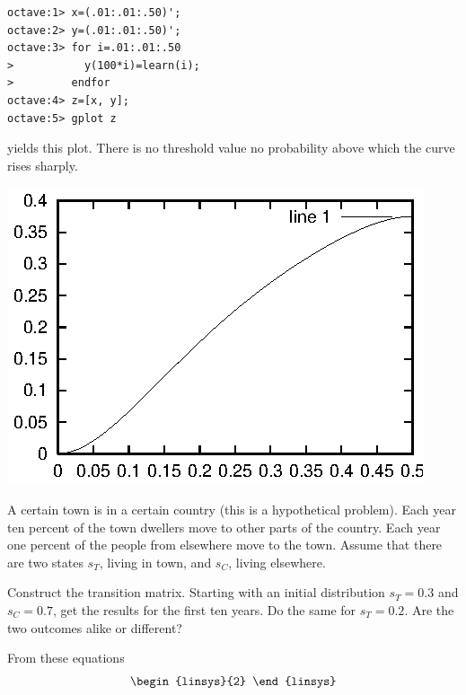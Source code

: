 \begin{exercises}
\begin{answer}
\begin{exparts}
\begin{lstlisting}
octave:1> x=(.01:.01:.50)';
octave:2> y=(.01:.01:.50)';
octave:3> for i=.01:.01:.50   
>           y(100*i)=learn(i);
>         endfor
octave:4> z=[x, y];
octave:5> gplot z
\end{lstlisting}
        yields this plot.
        There is no threshold value \Dash  no probability above which the
        curve rises sharply.
        \begin{center}
          \includegraphics{learn5.eps}
        \end{center}
      \end{exparts}
    \end{answer}
  \item 
     A certain town is in a certain country 
     (this is a hypothetical problem).
     Each year ten percent of the town dwellers move to other parts of 
     the country.
     Each year one percent of the people from elsewhere move to the town.
     Assume that there are two states $s_T$, living in town, and $s_C$,
     living elsewhere.
     \begin{exparts}
       \partsitem Construct the transition matrix.
       \partsitem Starting with an initial distribution $s_T=0.3$
         and $s_C=0.7$, get the results for the first ten years.
       \partsitem Do the same for $s_T=0.2$.
       \partsitem Are the two outcomes alike or different?
     \end{exparts}
     \begin{answer}
       \begin{exparts}
         \partsitem From these equations
           \begin{equation*}
             \begin{linsys}{2}

\end{linsys}
\end{equation*}
\end{exparts}
\end{answer}
\end{exercises}
